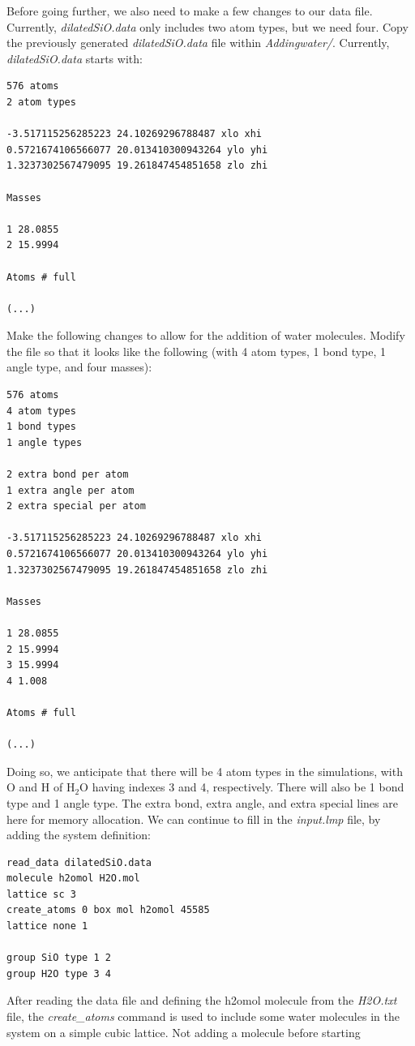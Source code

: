 \documentclass[9pt,tutorial]{livecoms}
\begin{document}
Before going further, we also need to make a few changes to our data file.
Currently, \textit{dilatedSiO.data} only includes two atom types, but we need four.
Copy the previously generated \textit{dilatedSiO.data} file within \textit{Addingwater/}.
Currently, \textit{dilatedSiO.data} starts with:
{\normalsize \begin{verbatim}
576 atoms
2 atom types

-3.517115256285223 24.10269296788487 xlo xhi
0.5721674106566077 20.013410300943264 ylo yhi
1.3237302567479095 19.261847454851658 zlo zhi

Masses

1 28.0855
2 15.9994

Atoms # full

(...)
\end{verbatim}}
Make the following changes to allow for the addition of water molecules. Modify
the file so that it looks like the following (with 4 atom types, 1 bond type,
1 angle type, and four masses):
{\normalsize \begin{verbatim}
576 atoms
4 atom types
1 bond types
1 angle types

2 extra bond per atom
1 extra angle per atom
2 extra special per atom

-3.517115256285223 24.10269296788487 xlo xhi
0.5721674106566077 20.013410300943264 ylo yhi
1.3237302567479095 19.261847454851658 zlo zhi

Masses

1 28.0855
2 15.9994
3 15.9994
4 1.008

Atoms # full

(...)
\end{verbatim}}
Doing so, we anticipate that there will be 4 atom types in the simulations,
with O and H of $\text{H}_2\text{O}$ having indexes 3 and 4, respectively. There
will also be 1 bond type and 1 angle type. The extra bond, extra angle, and
extra special lines are here for memory allocation. We can continue to fill in
the \textit{input.lmp} file, by adding the system definition:
{\normalsize \begin{verbatim}
read_data dilatedSiO.data
molecule h2omol H2O.mol
lattice sc 3
create_atoms 0 box mol h2omol 45585
lattice none 1

group SiO type 1 2
group H2O type 3 4
\end{verbatim}}
After reading the data file and defining the h2omol molecule from the \textit{H2O.txt}
file, the \textit{create\_atoms} command is used to include some water molecules
in the system on a simple cubic lattice. Not adding a molecule before starting
\end{document}

